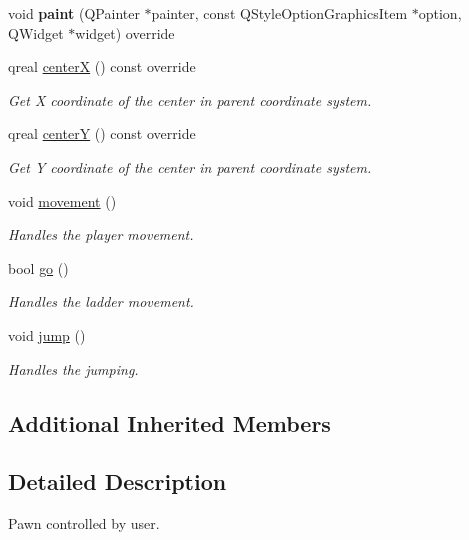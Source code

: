 \begin{DoxyCompactItemize}
void {\bfseries paint} (Q\+Painter $\ast$painter, const Q\+Style\+Option\+Graphics\+Item $\ast$option, Q\+Widget $\ast$widget) override
\item 
qreal \hyperlink{class_player_ac5fcb472ea5e7e2222c13e086ced0aa1}{centerX} () const override
\begin{DoxyCompactList}\small\item\em Get X coordinate of the center in parent coordinate system. \end{DoxyCompactList}\item 
qreal \hyperlink{class_player_ac67429e56fbd74495b4614b7b27ca5f6}{centerY} () const override
\begin{DoxyCompactList}\small\item\em Get Y coordinate of the center in parent coordinate system. \end{DoxyCompactList}\item 
\mbox{\label{class_player_ae82e446dea8858501f28172ff141abf5}} 
void \hyperlink{class_player_ae82e446dea8858501f28172ff141abf5}{movement} ()
\begin{DoxyCompactList}\small\item\em Handles the player movement. \end{DoxyCompactList}\item 
bool \hyperlink{class_player_a8bd85eaca498fc1c6638dbe90e694db8}{go} ()
\begin{DoxyCompactList}\small\item\em Handles the ladder movement. \end{DoxyCompactList}\item 
\mbox{\label{class_player_a70e21ca98281b7d72f105f2693113d7e}} 
void \hyperlink{class_player_a70e21ca98281b7d72f105f2693113d7e}{jump} ()
\begin{DoxyCompactList}\small\item\em Handles the jumping. \end{DoxyCompactList}\end{DoxyCompactItemize}
\subsection*{Additional Inherited Members}


\subsection{Detailed Description}
Pawn controlled by user. 


